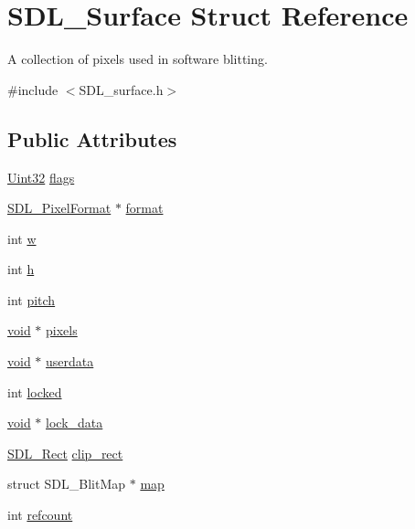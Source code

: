 \hypertarget{struct_s_d_l___surface}{}\section{S\+D\+L\+\_\+\+Surface Struct Reference}
\label{struct_s_d_l___surface}


A collection of pixels used in software blitting.  




{\ttfamily \#include $<$S\+D\+L\+\_\+surface.\+h$>$}

\subsection*{Public Attributes}
\begin{DoxyCompactItemize}
\item 
\mbox{\hyperlink{_s_d_l__stdinc_8h_add440eff171ea5f55cb00c4a9ab8672d}{Uint32}} \mbox{\hyperlink{struct_s_d_l___surface_a86d78b665d5dfd7aa1dd9696b067641b}{flags}}
\item 
\mbox{\hyperlink{struct_s_d_l___pixel_format}{S\+D\+L\+\_\+\+Pixel\+Format}} $\ast$ \mbox{\hyperlink{struct_s_d_l___surface_a0a90721f947c10c3b79e02ccb419ca62}{format}}
\item 
int \mbox{\hyperlink{struct_s_d_l___surface_a9b0ec7185dcdb2a3530a9160a6ea83d9}{w}}
\item 
int \mbox{\hyperlink{struct_s_d_l___surface_af33bcf87a1f5e10a99b3c7e8626b38c8}{h}}
\item 
int \mbox{\hyperlink{struct_s_d_l___surface_a5fa37325d77d65b2ed64ffc7cd01bb6c}{pitch}}
\item 
\mbox{\hyperlink{_s_d_l__opengles2__gl2ext_8h_ae5d8fa23ad07c48bb609509eae494c95}{void}} $\ast$ \mbox{\hyperlink{struct_s_d_l___surface_abd9597e0e084b8ef33fe0397bc26d911}{pixels}}
\item 
\mbox{\hyperlink{_s_d_l__opengles2__gl2ext_8h_ae5d8fa23ad07c48bb609509eae494c95}{void}} $\ast$ \mbox{\hyperlink{struct_s_d_l___surface_ae66d973dcb9b57cb34815892e1ee1f31}{userdata}}
\item 
int \mbox{\hyperlink{struct_s_d_l___surface_a5022edaeea1c0a055fa5d6dccba41de2}{locked}}
\item 
\mbox{\hyperlink{_s_d_l__opengles2__gl2ext_8h_ae5d8fa23ad07c48bb609509eae494c95}{void}} $\ast$ \mbox{\hyperlink{struct_s_d_l___surface_a0afacfb933b54a9af0846a307a6924fb}{lock\+\_\+data}}
\item 
\mbox{\hyperlink{struct_s_d_l___rect}{S\+D\+L\+\_\+\+Rect}} \mbox{\hyperlink{struct_s_d_l___surface_aa9a0da3b38261dad6cf0cc4e3bb5b0c3}{clip\+\_\+rect}}
\item 
struct S\+D\+L\+\_\+\+Blit\+Map $\ast$ \mbox{\hyperlink{struct_s_d_l___surface_a8c1ecad399b0d4f525b1a53b6ee9393f}{map}}
\item 
int \mbox{\hyperlink{struct_s_d_l___surface_a03d10628a359c0674f5ceffd574f1641}{refcount}}
\end{DoxyCompactItemize}


